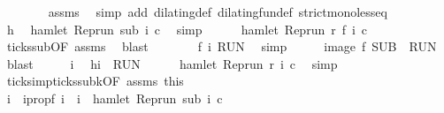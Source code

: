 \begin{isabellebody}
\ \ \ \ \ \ \isamarkupfalse%
\ assms\ \isamarkupfalse%
\ {\isacharparenleft}simp\ add{\isacharcolon}\ dilating{\isacharunderscore}def\ dilating{\isacharunderscore}fun{\isacharunderscore}def\ strict{\isacharunderscore}mono{\isacharunderscore}less{\isacharunderscore}eq{\isacharparenright}\isanewline
\ \ \ \ \isamarkupfalse%
\ \isamarkupfalse%
\ h\ \isamarkupfalse%
\ {\isacartoucheopen}hamlet\ {\isacharparenleft}{\isacharparenleft}Rep{\isacharunderscore}run\ sub{\isacharparenright}\ i\ c{\isacharparenright}{\isacartoucheclose}\ \isamarkupfalse%
\ simp\isanewline
\ \ \ \ \isamarkupfalse%
\ {\isacartoucheopen}hamlet\ {\isacharparenleft}{\isacharparenleft}Rep{\isacharunderscore}run\ r{\isacharparenright}\ {\isacharparenleft}f\ i{\isacharparenright}\ c{\isacharparenright}{\isacartoucheclose}\ \isamarkupfalse%
\ ticks{\isacharunderscore}sub{\isacharbrackleft}OF\ assms{\isacharbrackright}\ \isamarkupfalse%
\ blast\isanewline
\ \ \ \ \isamarkupfalse%
\ \isamarkupfalse%
\ {\isacartoucheopen}f\ i\ {\isasymin}{\isacharquery}RUN{\isacartoucheclose}\ \isamarkupfalse%
\ simp\isanewline
\ \ \isacommand{{\isacharbraceright}}\isamarkupfalse%
\ \isamarkupfalse%
\ {\isacartoucheopen}image\ f\ {\isacharquery}SUB\ {\isasymsubseteq}\ {\isacharquery}RUN{\isacartoucheclose}\ \isamarkupfalse%
\ blast\isanewline
{}\isamarkupfalse%
\isanewline
\ \ \isacommand{{\isacharbraceleft}}\isamarkupfalse%
\ \isamarkupfalse%
\ i\ \isamarkupfalse%
\ h{\isacharcolon}{\isacartoucheopen}i\ {\isasymin}\ {\isacharquery}RUN{\isacartoucheclose}\isanewline
\ \ \ \ \isamarkupfalse%
\ {\isacartoucheopen}hamlet\ {\isacharparenleft}{\isacharparenleft}Rep{\isacharunderscore}run\ r{\isacharparenright}\ i\ c{\isacharparenright}{\isacartoucheclose}\ \isamarkupfalse%
\ simp\isanewline
\ \ \ \ \isamarkupfalse%
\ ticks{\isacharunderscore}imp{\isacharunderscore}ticks{\isacharunderscore}subk{\isacharbrackleft}OF\ assms\ this{\isacharbrackright}\isanewline
\ \ \ \ \ \ \isamarkupfalse%
\ i\ \ i{}prop{\isacharcolon}{\isacartoucheopen}f\ i\ {\isacharequal}\ i\ {\isasymand}\ hamlet\ {\isacharparenleft}{\isacharparenleft}Rep{\isacharunderscore}run\ sub{\isacharparenright}\ i\ c{\isacharparenright}{\isacartoucheclose}\ \isamarkupfalse%

\end{isabellebody}
